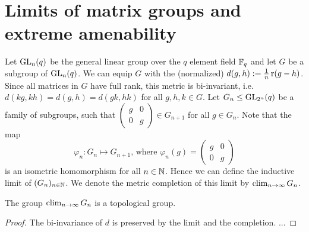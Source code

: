 






\section{Limits of matrix groups and extreme amenability}\label{sec:generalDefns}
Let $\operatorname{GL}_n(q)$ be the general linear group over the $q$ element field $\mathbb{F}_q$ and let $G$ be a subgroup of $\operatorname{GL}_n(q)$. We can equip $G$ with the (normalized)  $d(g,h):=\frac{1}{n}\operatorname{r}(g-h)$.
Since all matrices in $G$ have full rank, this metric is bi-invariant, i.e. $d(kg,kh)=d(g,h)=d(gk,hk)$ for all $g,h,k\in G$. 
Let $G_n\leq \operatorname{GL}_{2^n}(q)$ be a family of subgroups, such that 
$\begin{pmatrix}
g &0\\
0&g
\end{pmatrix}\in G_{n+1}$ for all $g\in G_n$. Note that the map
\[\varphi_n\colon G_n\mapsto G_{n+1}\text{, where }\varphi_n(g)=\begin{pmatrix}
g &0\\
0&g
\end{pmatrix}\]
is an isometric homomorphism for all $n\in\mathbb{N}$. Hence we can define the inductive limit of $(G_n)_{n\in\mathbb{N}}$. We denote the metric completion of this limit by $\operatorname{clim}\limits_{n\to\infty} G_n$.%




\begin{lemma}\label{lem:GroupTopo}
The group $\operatorname{clim}\limits_{n\to\infty} G_n$ is a topological group.
\end{lemma}
\begin{proof}
The bi-invariance of $d$ is preserved by the limit and the completion. ... 
\end{proof}

